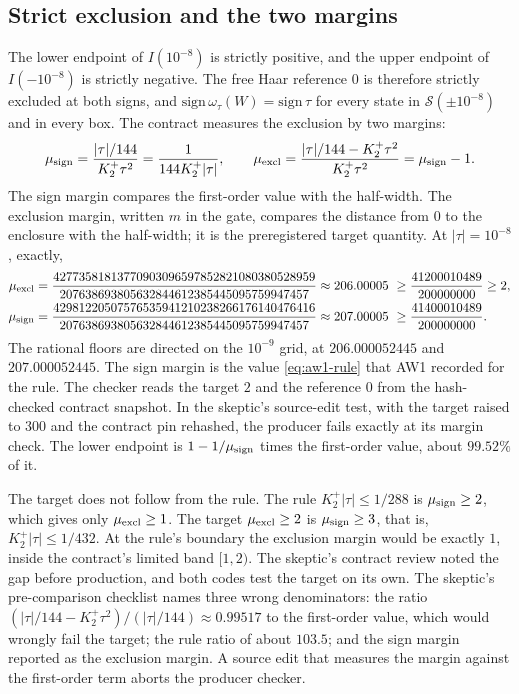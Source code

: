 \subsection{Strict exclusion and the two margins}
\label{sec:aw2-margins}
The lower endpoint of $I(10^{-8})$ is strictly positive, and the upper
endpoint of $I(-10^{-8})$ is strictly negative. The free Haar reference $0$ is
therefore strictly excluded at both signs, and
$\mathrm{sign}\,\omega_\tau(W)=\mathrm{sign}\,\tau$ for every state in
$\mathcal S(\pm10^{-8})$ and in every box. The contract measures the exclusion
by two margins:
\begin{equation}
 \mu_{\rm sign}=\frac{|\tau|/144}{K_2^+\tau^2}=\frac{1}{144K_2^+|\tau|},\qquad
 \mu_{\rm excl}=\frac{|\tau|/144-K_2^+\tau^2}{K_2^+\tau^2}=\mu_{\rm sign}-1 .
 \label{eq:aw2-margin-def}
\end{equation}
The sign margin compares the first-order value with the half-width. The
exclusion margin, written $m$ in the gate, compares the distance from $0$ to
the enclosure with the half-width; it is the preregistered target quantity.
At $|\tau|=10^{-8}$, exactly,
\begin{equation}
 \begin{aligned}
 \mu_{\rm excl}&=\frac{42773581813770903096597852821080380528959}{207638693805632844612385445095759947457}
 \approx206.00005\ \ge\frac{41200010489}{200000000}\ge2,\\
 \mu_{\rm sign}&=\frac{42981220507576535941210238266176140476416}{207638693805632844612385445095759947457}
 \approx207.00005\ \ge\frac{41400010489}{200000000}.
 \end{aligned}
 \label{eq:aw2-margins}
\end{equation}
The rational floors are directed on the $10^{-9}$ grid, at $206.000052445$ and
$207.000052445$. The sign margin is the value \eqref{eq:aw1-rule} that AW1
recorded for the rule. The checker reads the target $2$ and the reference $0$
from the hash-checked contract snapshot. In the skeptic's source-edit test,
with the target raised to 300 and the contract pin rehashed, the producer
fails exactly at its margin check. The lower
endpoint is $1-1/\mu_{\rm sign}$ times the first-order value, about $99.52\%$
of it.

The target does not follow from the rule. The rule
$K_2^+|\tau|\le1/288$ is $\mu_{\rm sign}\ge2$, which gives only
$\mu_{\rm excl}\ge1$. The target $\mu_{\rm excl}\ge2$ is
$\mu_{\rm sign}\ge3$, that is, $K_2^+|\tau|\le1/432$. At the rule's boundary
the exclusion margin would be exactly $1$, inside the contract's limited band
$[1,2)$. The skeptic's contract review noted the gap before production, and
both codes test the target on its own. The skeptic's pre-comparison
checklist names three wrong denominators: the ratio
$(|\tau|/144-K_2^+\tau^2)/(|\tau|/144)\approx0.99517$ to the first-order value,
which would wrongly fail the target; the rule ratio of about $103.5$; and the
sign margin reported as the exclusion margin. A source edit that measures the
margin against the first-order term aborts the producer checker.

